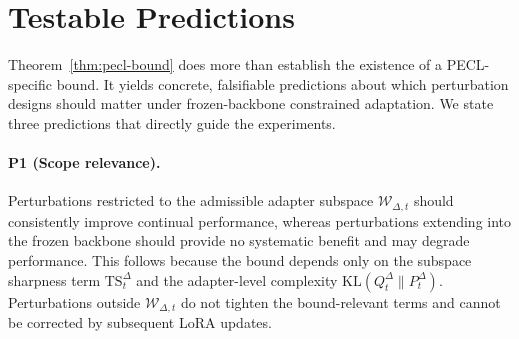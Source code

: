 \documentclass[10pt]{article} %
\begin{document}




\section{Testable Predictions}
\label{sec:predictions}

Theorem~\ref{thm:pecl-bound} does more than establish the existence of a PECL-specific bound.
It yields concrete, falsifiable predictions about which perturbation designs should matter under frozen-backbone constrained adaptation.
We state three predictions that directly guide the experiments.

\paragraph{P1 (Scope relevance).}
Perturbations restricted to the admissible adapter subspace $\mathcal{W}_{\Delta,t}$ should consistently improve continual performance, whereas perturbations extending into the frozen backbone should provide no systematic benefit and may degrade performance.
This follows because the bound depends only on the subspace sharpness term $\mathrm{TS}_t^\Delta$ and the adapter-level complexity $\mathrm{KL}(Q_t^\Delta \| P_t^\Delta)$.
Perturbations outside $\mathcal{W}_{\Delta,t}$ do not tighten the bound-relevant terms and cannot be corrected by subsequent LoRA updates.
\end{document}
